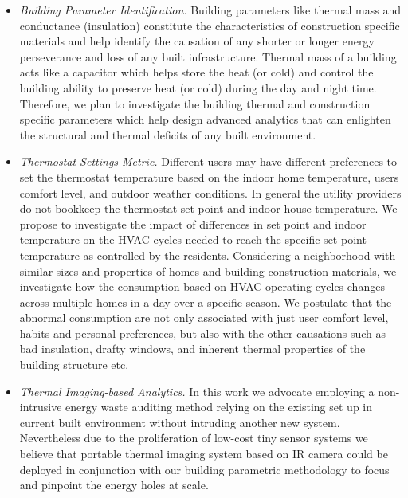 \documentclass{sig-alternate}
\begin{document}
\begin{itemize}
  \item \emph{Building Parameter Identification.} Building parameters like thermal mass and conductance (insulation) constitute the characteristics of construction specific materials and help identify the causation of any shorter or longer energy perseverance and loss of any built infrastructure. Thermal mass of a building acts like a capacitor which helps store the heat (or cold) and control the building ability to preserve heat (or cold) during the day and night time. Therefore, we plan to investigate the building thermal and construction specific parameters which help design advanced analytics that can enlighten the structural and thermal deficits of any built environment. %
  \item \emph{Thermostat Settings Metric.} Different users may have different preferences to set the thermostat temperature based on the indoor home temperature, users comfort level, and outdoor weather conditions. In general the utility providers do not bookkeep the thermostat set point and indoor house temperature. We propose to investigate the impact of differences in set point and indoor temperature on the HVAC cycles needed to reach the specific set point temperature as controlled by the residents. Considering a neighborhood with similar sizes and properties of homes and building construction materials, we investigate how the consumption based on HVAC operating cycles changes across multiple homes in a day over a specific season. We postulate that the abnormal consumption are not only associated with just user comfort level, habits and personal preferences, but also with the other causations such as bad insulation, drafty windows, and inherent thermal properties of the building structure etc.
  \item \emph{Thermal Imaging-based Analytics.} In this work we advocate employing a non-intrusive energy waste auditing method relying on the existing set up in current built environment without intruding another new system. Nevertheless due to the proliferation of low-cost tiny sensor systems we believe that portable thermal imaging system based on IR camera could be deployed in conjunction with our building parametric methodology to focus and pinpoint the energy holes at scale. 
\end{itemize}
\end{document}
